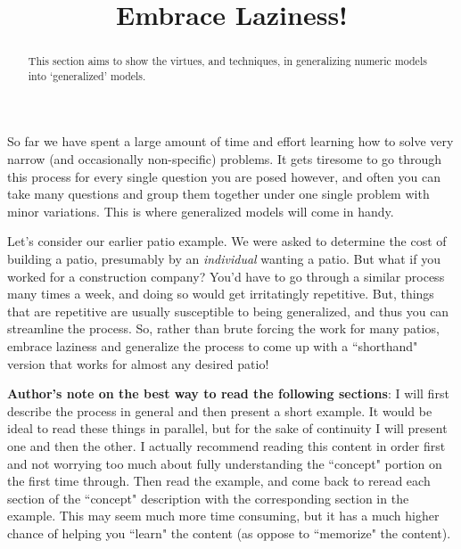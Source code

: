 \documentclass{ximeraXloud}
\title{Embrace Laziness!}
\begin{document}
\begin{abstract}
    This section aims to show the virtues, and techniques, in generalizing numeric models into `generalized' models.
\end{abstract}
\maketitle

So far we have spent a large amount of time and effort learning how to solve very narrow (and occasionally non-specific) problems. It gets tiresome to go through this process for every single question you are posed however, and often you can take many questions and group them together under one single problem with minor variations. This is where generalized models will come in handy.

Let's consider our earlier patio example. We were asked to determine the cost of building a patio, presumably by an \textit{individual} wanting a patio. But what if you worked for a construction company? You'd have to go through a similar process many times a week, and doing so would get irritatingly repetitive. But, things that are repetitive are usually susceptible to being generalized, and thus you can streamline the process. So, rather than brute forcing the work for many patios, embrace laziness and generalize the process to come up with a ``shorthand" version that works for almost any desired patio!

\textbf{Author's note on the best way to read the following sections}: I will first describe the process in general and then present a short example. It would be ideal to read these things in parallel, but for the sake of continuity I will present one and then the other. I actually recommend reading this content in order first and not worrying too much about fully understanding the ``concept" portion on the first time through. Then read the example, and come back to reread each section of the ``concept" description with the corresponding section in the example. This may seem much more time consuming, but it has a much higher chance of helping you ``learn" the content (as oppose to ``memorize" the content).
\end{document}
